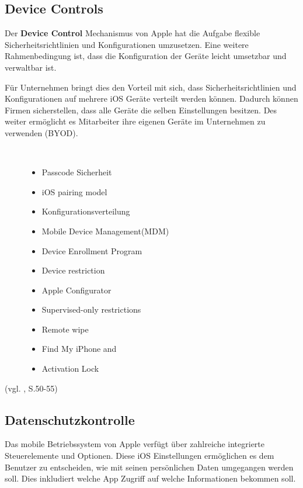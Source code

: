 \subsection{Device Controls}
\label{sec:DeviceControl}

Der \textbf{Device Control} Mechanismus von Apple hat die Aufgabe flexible Sicherheitsrichtlinien und Konfigurationen umzusetzen. Eine weitere Rahmenbedingung ist, dass die Konfiguration der Geräte leicht umsetzbar und verwaltbar ist.\par 
 Für Unternehmen bringt dies den Vorteil mit sich, dass Sicherheitsrichtlinien und Konfigurationen auf mehrere iOS Geräte verteilt werden können. Dadurch können Firmen sicherstellen, dass alle Geräte die selben Einstellungen besitzen. Des weiter ermöglicht es Mitarbeiter ihre eigenen Geräte im Unternehmen zu verwenden (BYOD). 

\begin{description}
    \item[\parbox{\textwidth} {Dies sind die Mainfeature des Apple Device Control Service} ]~\par
    \begin{multicols}{2}
    \begin{itemize}
        \item Passcode Sicherheit
        \item iOS pairing model
        \item Konfigurationsverteilung
        \item Mobile Device Management(MDM)
        \item Device Enrollment Program
        \item Device restriction
        \item Apple Configurator
        \item Supervised-only restrictions
        \item Remote wipe
        \item Find My iPhone and 
        \item Activation Lock
    \end{itemize}
    \end{multicols}
\end{description}
(vgl. \cite{Apple[4]}, S.50-55)

\subsection{Datenschutzkontrolle}
\label{sec:PrivacyControls}
Das mobile Betriebssystem von Apple verfügt über zahlreiche integrierte Steuerelemente und Optionen. Diese iOS Einstellungen ermöglichen es dem Benutzer zu entscheiden, wie mit seinen persönlichen Daten umgegangen werden soll. Dies inkludiert welche App Zugriff auf welche Informationen bekommen soll. 

